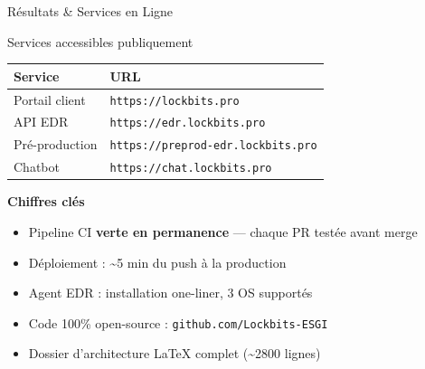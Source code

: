 \documentclass[xcolor=dvipsnames, aspectratio=169, 10pt]{beamer}
\newcommand{\bitem}{\item[$\bullet$]}
\begin{document}
\begin{frame}{Résultats \& Services en Ligne}
  \begin{exampleblock}{Services accessibles publiquement}
    \centering
    \begin{tabularx}{\textwidth}{@{}l X@{}}
      \toprule
      \textbf{Service} & \textbf{URL} \\
      \midrule
      Portail client & \texttt{https://lockbits.pro} \\
      API EDR & \texttt{https://edr.lockbits.pro} \\
      Pré-production & \texttt{https://preprod-edr.lockbits.pro} \\
      Chatbot & \texttt{https://chat.lockbits.pro} \\
      \bottomrule
    \end{tabularx}
  \end{exampleblock}
  \vspace{0.3cm}
  \textbf{Chiffres clés}
  \begin{itemize}
    \bitem Pipeline CI \textbf{verte en permanence} — chaque PR testée avant merge
    \bitem Déploiement : \textasciitilde5 min du push à la production
    \bitem Agent EDR : installation one-liner, 3 OS supportés
    \bitem Code 100\% open-source : \texttt{github.com/Lockbits-ESGI}
    \bitem Dossier d'architecture LaTeX complet (\textasciitilde2800 lignes)
  \end{itemize}
\end{frame}

\end{document}
